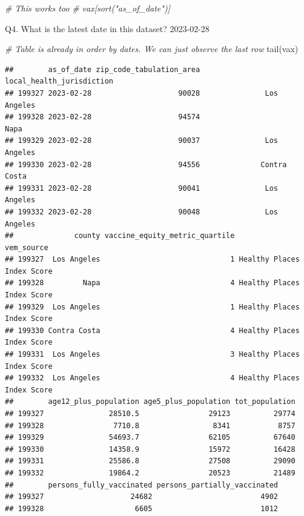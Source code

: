 \documentclass[
]{article}
\newenvironment{Shaded}{\begin{snugshade}}{\end{snugshade}}
\newcommand{\CommentTok}[1]{\textcolor[rgb]{0.56,0.35,0.01}{\textit{#1}}}
\newcommand{\FunctionTok}[1]{\textcolor[rgb]{0.00,0.00,0.00}{#1}}
\newcommand{\NormalTok}[1]{#1}
\begin{document}
\begin{Shaded}
\begin{Highlighting}[]
\CommentTok{\# This works too}
\CommentTok{\# vax[sort("as\_of\_date")]}
\end{Highlighting}
\end{Shaded}

Q4. What is the latest date in this dataset? 2023-02-28

\begin{Shaded}
\begin{Highlighting}[]
\CommentTok{\# Table is already in order by dates. We can just observe the last row}
\FunctionTok{tail}\NormalTok{(vax)}
\end{Highlighting}
\end{Shaded}

\begin{verbatim}
##        as_of_date zip_code_tabulation_area local_health_jurisdiction
## 199327 2023-02-28                    90028               Los Angeles
## 199328 2023-02-28                    94574                      Napa
## 199329 2023-02-28                    90037               Los Angeles
## 199330 2023-02-28                    94556              Contra Costa
## 199331 2023-02-28                    90041               Los Angeles
## 199332 2023-02-28                    90048               Los Angeles
##              county vaccine_equity_metric_quartile                 vem_source
## 199327  Los Angeles                              1 Healthy Places Index Score
## 199328         Napa                              4 Healthy Places Index Score
## 199329  Los Angeles                              1 Healthy Places Index Score
## 199330 Contra Costa                              4 Healthy Places Index Score
## 199331  Los Angeles                              3 Healthy Places Index Score
## 199332  Los Angeles                              4 Healthy Places Index Score
##        age12_plus_population age5_plus_population tot_population
## 199327               28510.5                29123          29774
## 199328                7710.8                 8341           8757
## 199329               54693.7                62105          67640
## 199330               14358.9                15972          16428
## 199331               25586.8                27508          29090
## 199332               19864.2                20523          21489
##        persons_fully_vaccinated persons_partially_vaccinated
## 199327                    24682                         4902
## 199328                     6605                         1012

\end{verbatim}
\end{document}

